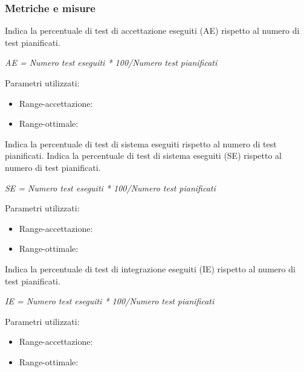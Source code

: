 \documentclass[a4paper,11pt]{article}
\begin{document}
\begin{itemize}
\subsubsection{Metriche e misure}
Indica la percentuale di test di accettazione eseguiti (AE) rispetto al numero di test pianificati.
\begin{center}
\textit{AE = Numero test eseguiti * 100/Numero test pianificati}
\end{center}
Parametri utilizzati: 
\begin{itemize}
	\item Range-accettazione: \begin{math}[100\%]\end{math}
\item Range-ottimale: \begin{math}[100\%]\end{math}
	\end{itemize}
Indica la percentuale di test di sistema eseguiti rispetto al numero di test pianificati.
Indica la percentuale di test di sistema eseguiti (SE) rispetto al numero di test pianificati.
\begin{center}
\textit{SE = Numero test eseguiti * 100/Numero test pianificati}
\end{center}
Parametri utilizzati: 
\begin{itemize}
	\item Range-accettazione: \begin{math}[100\%]\end{math}
\item Range-ottimale: \begin{math}[100\%]\end{math}
	\end{itemize}

Indica la percentuale di test di integrazione eseguiti (IE) rispetto al numero di test pianificati.
\begin{center}
\textit{IE = Numero test eseguiti * 100/Numero test pianificati}
\end{center}
Parametri utilizzati: 
\begin{itemize}
	\item Range-accettazione: \begin{math}[70\%]\end{math}
\item Range-ottimale: \begin{math}[60\%]\end{math}
	\end{itemize}


\end{itemize}
\end{document}
